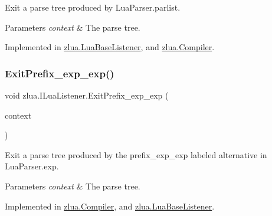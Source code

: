 Exit a parse tree produced by Lua\+Parser.\+parlist. 


\begin{DoxyParams}{Parameters}
{\em context} & The parse tree.\\
\hline
\end{DoxyParams}


Implemented in \mbox{\hyperlink{classzlua_1_1_lua_base_listener_af7c71a424a8f8682ecd95c95cff6e64b}{zlua.\+Lua\+Base\+Listener}}, and \mbox{\hyperlink{classzlua_1_1_compiler_a90fc72d7a58e9c5d6386366362ceb0c8}{zlua.\+Compiler}}.

\mbox{\label{interfacezlua_1_1_i_lua_listener_a88094687ca2271e4cbef04c18a738b99}} 
\subsubsection{\texorpdfstring{Exit\+Prefix\+\_\+exp\+\_\+exp()}{ExitPrefix\_exp\_exp()}}
{\footnotesize\ttfamily void zlua.\+I\+Lua\+Listener.\+Exit\+Prefix\+\_\+exp\+\_\+exp (\begin{DoxyParamCaption}\item[{\mbox{[}\+Not\+Null\mbox{]} \mbox{\hyperlink{classzlua_1_1_lua_parser_1_1_prefix__exp__exp_context}{Lua\+Parser.\+Prefix\+\_\+exp\+\_\+exp\+Context}}}]{context }\end{DoxyParamCaption})}



Exit a parse tree produced by the {\ttfamily prefix\+\_\+exp\+\_\+exp} labeled alternative in Lua\+Parser.\+exp. 


\begin{DoxyParams}{Parameters}
{\em context} & The parse tree.\\
\hline
\end{DoxyParams}


Implemented in \mbox{\hyperlink{classzlua_1_1_compiler_a4ce4dbd75b95a42421f7686f9ff35382}{zlua.\+Compiler}}, and \mbox{\hyperlink{classzlua_1_1_lua_base_listener_a7127f827c3355d3bac100faa365ffa5b}{zlua.\+Lua\+Base\+Listener}}.

\mbox{\label{interfacezlua_1_1_i_lua_listener_a844508765196c91884c10bcaa1a14424}} 
